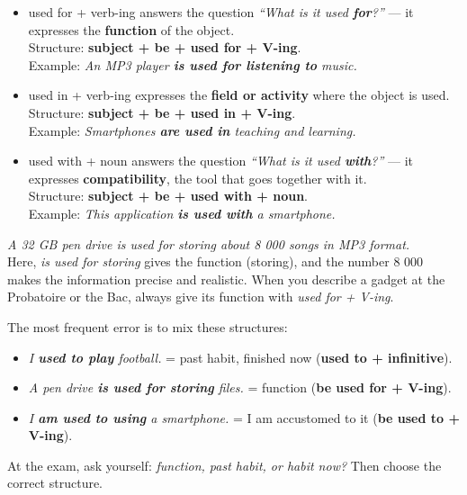 \documentclass[11pt]{article}
\newcommand{\cle}[1]{{\popxbold\color{popdark}#1}}
\begin{document}
\begin{propriete}
\begin{itemize}
\item \cle{used for + verb-ing} answers the question \emph{``What is it used \textbf{for}?''} — it expresses the \textbf{function} of the object.\\ Structure: \textbf{subject + be + used for + V-ing}.\\ Example: \emph{An MP3 player \textbf{is used for listening to} music.}
\item \cle{used in + verb-ing} expresses the \textbf{field or activity} where the object is used.\\ Structure: \textbf{subject + be + used in + V-ing}.\\ Example: \emph{Smartphones \textbf{are used in} teaching and learning.}
\item \cle{used with + noun} answers the question \emph{``What is it used \textbf{with}?''} — it expresses \textbf{compatibility}, the tool that goes together with it.\\ Structure: \textbf{subject + be + used with + noun}.\\ Example: \emph{This application \textbf{is used with} a smartphone.}
\end{itemize}
\end{propriete}

\begin{exemplebox}
\emph{A 32 GB pen drive is used for storing about 8 000 songs in MP3 format.}\\
Here, \emph{is used for storing} gives the function (storing), and the number 8 000 makes the information precise and realistic. When you describe a gadget at the Probatoire or the Bac, always give its function with \emph{used for + V-ing}.
\end{exemplebox}

\begin{attention}
The most frequent error is to mix these structures:
\begin{itemize}
\item \emph{I \textbf{used to play} football.} = past habit, finished now (\textbf{used to + infinitive}).
\item \emph{A pen drive \textbf{is used for storing} files.} = function (\textbf{be used for + V-ing}).
\item \emph{I \textbf{am used to using} a smartphone.} = I am accustomed to it (\textbf{be used to + V-ing}).
\end{itemize}
At the exam, ask yourself: \emph{function, past habit, or habit now?} Then choose the correct structure.
\end{attention}
\end{document}
